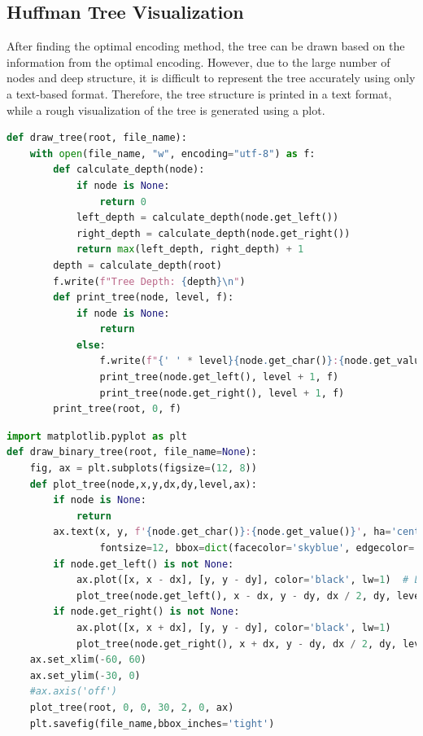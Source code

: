 \documentclass[12pt]{article}
\begin{document}
\subsection{Huffman Tree Visualization}
After finding the optimal encoding method, the tree can be drawn based on the information from the optimal encoding. However, due to the large number of nodes and deep structure, it is difficult to represent the tree accurately using only a text-based format. Therefore, the tree structure is printed in a text format, while a rough visualization of the tree is generated using a plot.
\begin{tcolorbox}[colframe=black, colback=white, boxrule=0.4mm, sharp corners=southwest, title=Tree Description Code]
    \begin{lstlisting}[language=Python, breaklines=true]
def draw_tree(root, file_name):
    with open(file_name, "w", encoding="utf-8") as f:
        def calculate_depth(node):
            if node is None:
                return 0
            left_depth = calculate_depth(node.get_left())
            right_depth = calculate_depth(node.get_right())
            return max(left_depth, right_depth) + 1
        depth = calculate_depth(root)
        f.write(f"Tree Depth: {depth}\n")
        def print_tree(node, level, f):
            if node is None:
                return
            else:
                f.write(f"{' ' * level}{node.get_char()}:{node.get_value()}(level {level})\n")
                print_tree(node.get_left(), level + 1, f)
                print_tree(node.get_right(), level + 1, f)
        print_tree(root, 0, f)
\end{lstlisting}
\end{tcolorbox}
\begin{tcolorbox}[colframe=black, colback=white, boxrule=0.4mm, sharp corners=southwest, title=Tree Painting Code]
    \begin{lstlisting}[language=Python, breaklines=true]
import matplotlib.pyplot as plt
def draw_binary_tree(root, file_name=None):
    fig, ax = plt.subplots(figsize=(12, 8))
    def plot_tree(node,x,y,dx,dy,level,ax):
        if node is None:
            return
        ax.text(x, y, f'{node.get_char()}:{node.get_value()}', ha='center', va='center',
                fontsize=12, bbox=dict(facecolor='skyblue', edgecolor='black', boxstyle="round,pad=0.5"))
        if node.get_left() is not None:
            ax.plot([x, x - dx], [y, y - dy], color='black', lw=1)  # Line from parent to left child
            plot_tree(node.get_left(), x - dx, y - dy, dx / 2, dy, level + 1, ax)
        if node.get_right() is not None:
            ax.plot([x, x + dx], [y, y - dy], color='black', lw=1)  
            plot_tree(node.get_right(), x + dx, y - dy, dx / 2, dy, level + 1, ax)
    ax.set_xlim(-60, 60)   
    ax.set_ylim(-30, 0) 
    #ax.axis('off') 
    plot_tree(root, 0, 0, 30, 2, 0, ax)
    plt.savefig(file_name,bbox_inches='tight') 
\end{lstlisting}
\end{tcolorbox}
\end{document}
